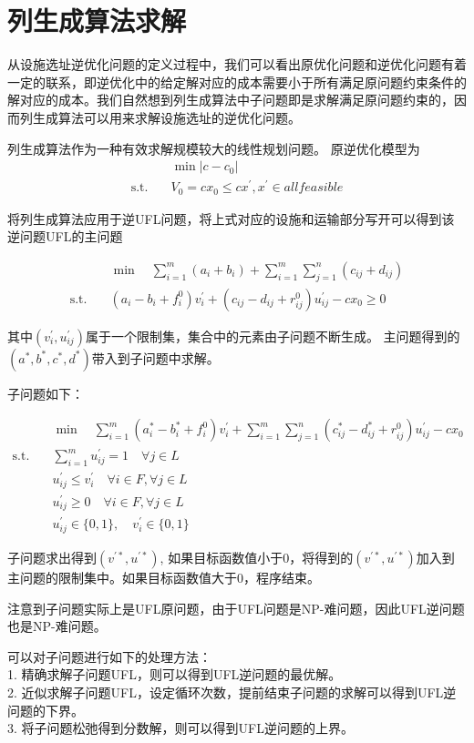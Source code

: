 \documentclass[UTF8]{article}
\begin{document}
\section{列生成算法求解}
从设施选址逆优化问题的定义过程中，我们可以看出原优化问题和逆优化问题有着一定的联系，即逆优化中的给定解对应的成本需要小于所有满足原问题约束条件的解对应的成本。我们自然想到列生成算法中子问题即是求解满足原问题约束的，因而列生成算法可以用来求解设施选址的逆优化问题。

列生成算法作为一种有效求解规模较大的线性规划问题。
原逆优化模型为
\begin{align*}
&\min |c-c_0|  \\
\text{s.t.}\quad & V_0 = cx_0 \leq cx^{'}, x^{'} \in all feasible
\end{align*}

将列生成算法应用于逆UFL问题，将上式对应的设施和运输部分写开可以得到该逆问题UFL的主问题

\begin{align*}
&\min \quad \sum_{i=1}^m(a_i+b_i)+\sum_{i=1}^m\sum_{j=1}^n(c_{ij}+d_{ij})\\
\text{s.t.}\quad & (a_i-b_i+f_i^0)v_i^{'} + (c_{ij}-d_{ij}+r_{ij}^0)u_{ij}^{'} - cx_0 \geq 0
\end{align*}

其中$(v_i^{'},u_{ij}^{'})$属于一个限制集，集合中的元素由子问题不断生成。
主问题得到的$(a^*,b^*,c^*,d^*)$带入到子问题中求解。

子问题如下：

\begin{align}
&\min \quad \sum_{i=1}^m(a_i^*-b_i^*+f_i^0)v_i^{'}+\sum_{i=1}^m\sum_{j=1}^n(c_{ij}^*-d_{ij}^*+r_{ij}^0)u_{ij}^{'}-cx_0\\
\text{s.t.}\quad & \sum_{i=1}^m u_{ij}^{'} =1 \quad \forall j\in L \\
& u_{ij}^{'} \leq v_{i}^{'} \quad \forall i \in F, \forall j \in L \\
& u_{ij}^{'} \geq 0 \quad \forall i \in F, \forall j \in L \\
&u_{ij}^{'} \in \{0,1\} ,\quad v_{i}^{'} \in \{0,1\}
\end{align}

子问题求出得到$(v^{'*},u^{'*})$, 如果目标函数值小于0，将得到的$(v^{'*},u^{'*})$加入到主问题的限制集中。如果目标函数值大于0，程序结束。

注意到子问题实际上是UFL原问题，由于UFL问题是NP-难问题，因此UFL逆问题也是NP-难问题。

可以对子问题进行如下的处理方法：\\
1. 精确求解子问题UFL，则可以得到UFL逆问题的最优解。\\
2. 近似求解子问题UFL，设定循环次数，提前结束子问题的求解可以得到UFL逆问题的下界。\\
3. 将子问题松弛得到分数解，则可以得到UFL逆问题的上界。
\end{document}

